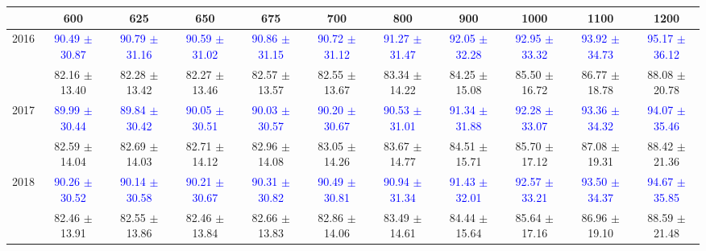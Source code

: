 {
\renewcommand{\arraystretch}{1.0}
\begin{center}
\begin{small}
\begin{tabular}{ccccccccccc}
\hline\hline
 & 600 & 625 & 650 & 675 & 700 & 800 & 900 & 1000 & 1100 & 1200 \\
\hline
\multirow{2}{*}{2016} & \textcolor{blue}{90.49 $\pm$ 30.87} & \textcolor{blue}{90.79 $\pm$ 31.16} & \textcolor{blue}{90.59 $\pm$ 31.02} & \textcolor{blue}{90.86 $\pm$ 31.15} & \textcolor{blue}{90.72 $\pm$ 31.12} & \textcolor{blue}{91.27 $\pm$ 31.47} & \textcolor{blue}{92.05 $\pm$ 32.28} & \textcolor{blue}{92.95 $\pm$ 33.32} & \textcolor{blue}{93.92 $\pm$ 34.73} & \textcolor{blue}{95.17 $\pm$ 36.12} \\
 & \textcolor{myred}{82.16 $\pm$ 13.40} & \textcolor{myred}{82.28 $\pm$ 13.42} & \textcolor{myred}{82.27 $\pm$ 13.46} & \textcolor{myred}{82.57 $\pm$ 13.57} & \textcolor{myred}{82.55 $\pm$ 13.67} & \textcolor{myred}{83.34 $\pm$ 14.22} & \textcolor{myred}{84.25 $\pm$ 15.08} & \textcolor{myred}{85.50 $\pm$ 16.72} & \textcolor{myred}{86.77 $\pm$ 18.78} & \textcolor{myred}{88.08 $\pm$ 20.78} \\
\hline
\multirow{2}{*}{2017} & \textcolor{blue}{89.99 $\pm$ 30.44} & \textcolor{blue}{89.84 $\pm$ 30.42} & \textcolor{blue}{90.05 $\pm$ 30.51} & \textcolor{blue}{90.03 $\pm$ 30.57} & \textcolor{blue}{90.20 $\pm$ 30.67} & \textcolor{blue}{90.53 $\pm$ 31.01} & \textcolor{blue}{91.34 $\pm$ 31.88} & \textcolor{blue}{92.28 $\pm$ 33.07} & \textcolor{blue}{93.36 $\pm$ 34.32} & \textcolor{blue}{94.07 $\pm$ 35.46} \\
 & \textcolor{myred}{82.59 $\pm$ 14.04} & \textcolor{myred}{82.69 $\pm$ 14.03} & \textcolor{myred}{82.71 $\pm$ 14.12} & \textcolor{myred}{82.96 $\pm$ 14.08} & \textcolor{myred}{83.05 $\pm$ 14.26} & \textcolor{myred}{83.67 $\pm$ 14.77} & \textcolor{myred}{84.51 $\pm$ 15.71} & \textcolor{myred}{85.70 $\pm$ 17.12} & \textcolor{myred}{87.08 $\pm$ 19.31} & \textcolor{myred}{88.42 $\pm$ 21.36} \\
\hline
\multirow{2}{*}{2018} & \textcolor{blue}{90.26 $\pm$ 30.52} & \textcolor{blue}{90.14 $\pm$ 30.58} & \textcolor{blue}{90.21 $\pm$ 30.67} & \textcolor{blue}{90.31 $\pm$ 30.82} & \textcolor{blue}{90.49 $\pm$ 30.81} & \textcolor{blue}{90.94 $\pm$ 31.34} & \textcolor{blue}{91.43 $\pm$ 32.01} & \textcolor{blue}{92.57 $\pm$ 33.21} & \textcolor{blue}{93.50 $\pm$ 34.37} & \textcolor{blue}{94.67 $\pm$ 35.85} \\
 & \textcolor{myred}{82.46 $\pm$ 13.91} & \textcolor{myred}{82.55 $\pm$ 13.86} & \textcolor{myred}{82.46 $\pm$ 13.84} & \textcolor{myred}{82.66 $\pm$ 13.83} & \textcolor{myred}{82.86 $\pm$ 14.06} & \textcolor{myred}{83.49 $\pm$ 14.61} & \textcolor{myred}{84.44 $\pm$ 15.64} & \textcolor{myred}{85.64 $\pm$ 17.16} & \textcolor{myred}{86.96 $\pm$ 19.10} & \textcolor{myred}{88.59 $\pm$ 21.48} \\
\hline\hline
\end{tabular}
\end{small}
\end{center}
}

